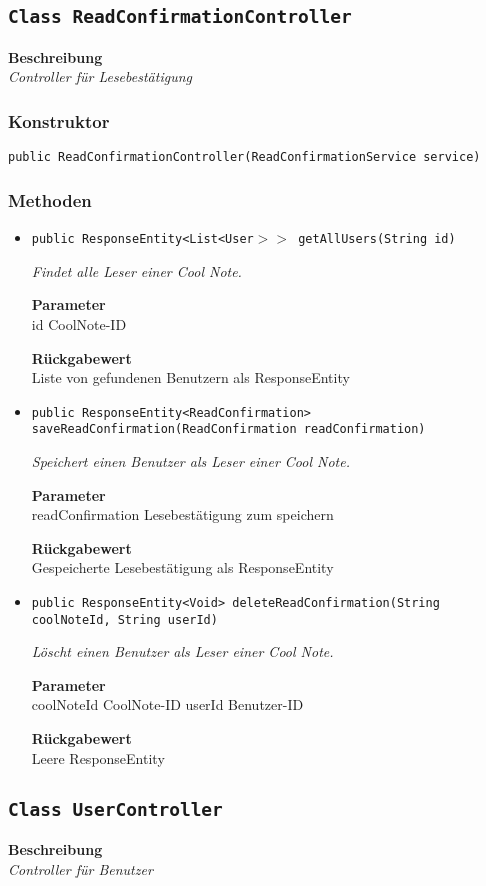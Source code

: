     \subsection{\texttt{Class ReadConfirmationController}}
    \textbf{Beschreibung} \\
    \textit{Controller für Lesebestätigung}
    \subsubsection{Konstruktor}
    \texttt{public ReadConfirmationController(ReadConfirmationService service)}
    \subsubsection{Methoden}
    \begin{itemize}
    	\item{\texttt{public ResponseEntity<List<User$>>$ getAllUsers(String id)}}
    	
    	\textit{Findet alle Leser einer Cool Note.}
    	
    	\textbf{Parameter} \\
    	id CoolNote-ID
    	
    	\textbf{Rückgabewert} \\
    	Liste von gefundenen Benutzern als ResponseEntity        \item{\texttt{public ResponseEntity<ReadConfirmation> saveReadConfirmation(ReadConfirmation readConfirmation)}}
    	
    	\textit{Speichert einen Benutzer als Leser einer Cool Note.}
    	
    	\textbf{Parameter} \\
    	readConfirmation Lesebestätigung zum speichern
    	
    	\textbf{Rückgabewert} \\
    	Gespeicherte Lesebestätigung als ResponseEntity        \item{\texttt{public ResponseEntity<Void> deleteReadConfirmation(String coolNoteId, String userId)}}
    	
    	\textit{Löscht einen Benutzer als Leser einer Cool Note.}
    	
    	\textbf{Parameter} \\
    	coolNoteId CoolNote-ID
    	userId Benutzer-ID
    	
    	\textbf{Rückgabewert} \\
    	Leere ResponseEntity
    \end{itemize}
    \subsection{\texttt{Class UserController}}
    \textbf{Beschreibung} \\
    \textit{Controller für Benutzer}
